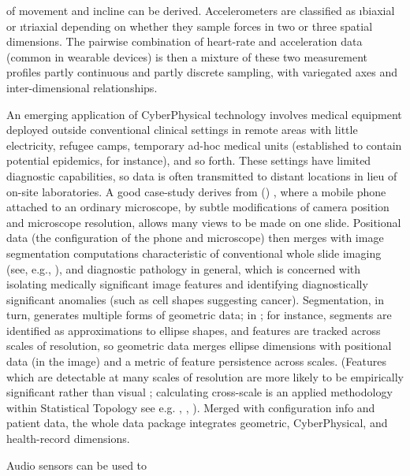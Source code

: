 {\begin{description}
of movement and incline can be derived.  Accelerometers are 
classified as \i{biaxial} or \i{triaxial} depending on 
whether they sample forces in two or three spatial 
dimensions.  
\pseudoIndent{}
The pairwise combination of heart-rate and acceleration data
(common in wearable devices) is then a mixture of these
two measurement profiles \mdash{} partly continuous and
partly discrete sampling, with variegated axes and
inter-dimensional relationships.  
\item[Remote Medical Diagnosis]  An emerging application of 
CyberPhysical technology involves medical equipment 
deployed outside conventional clinical settings 
\mdash{} in remote areas with little electricity, refugee 
camps, temporary ad-hoc medical units (established 
to contain potential epidemics, for instance), and 
so forth.  These settings have limited diagnostic 
capabilities, so data is often transmitted to distant 
locations in lieu of on-site laboratories.  
\pseudoIndent{}
A good case-study derives from  
(\mWSI{}) \cite{Auguste}, where a mobile 
phone attached to an ordinary microscope, 
by subtle modifications of camera position and microscope 
resolution, allows many views to be made on one slide.  
Positional data (the configuration of the phone and microscope) 
then merges with image segmentation 
computations characteristic of 
conventional whole slide imaging (see, e.g., 
\cite{Farahani}), and diagnostic pathology 
in general, which 
is concerned with isolating medically significant image 
features and identifying diagnostically significant 
anomalies (such as cell shapes 
suggesting cancer). 
\pseudoIndent{}
Segmentation, in turn, 
generates multiple forms of geometric data; in 
\cite{KaleAksoy}; for instance, segments are 
identified as approximations to ellipse shapes, 
and features are tracked across scales of resolution, 
so geometric data merges ellipse dimensions with 
positional data (in the image) and a metric 
of feature persistence across scales.  
(Features which are detectable at many scales of 
resolution are more likely to be empirically 
significant rather than visual ; calculating 
cross-scale  is an applied 
methodology within Statistical Topology \mdash{} 
see e.g. \cite{EdelsbrunnerHarer}, 
\cite{HaneyMaxwell}, \cite{HarryStrange}).  
Merged with \mWSI{} configuration info and patient data, the 
whole data package integrates geometric, CyberPhysical, 
and health-record dimensions. 
\item[Speech Sampling]  Audio sensors can be used to 

\end{description}}

